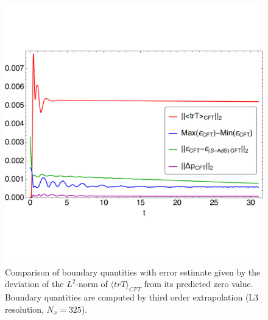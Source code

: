 \documentclass[a4paper,11pt]{article}
\begin{document}




\begin{figure}[!h]
        \centering
        \includegraphics[width=5.0in,clip=true]{plots/bdyplots/L3/L2-norm_trace_anisotropy_energydensityminusschw_maxminusminenergydensity/fullplotfillregttraceanisotropyenergydensityminusschwmaxminusminbdyenergydensity_L3.pdf}
\parbox{5.0in}{\caption{Comparison of boundary quantities with error estimate given by the deviation of the $L^2$-norm of $\langle trT\rangle_{CFT}$ from its predicted zero value. Boundary quantities are computed by third order extrapolation (L3 resolution, $N_x=325$).
        }\label{fig:fullplotfillregttraceanisotropyenergydensityminusschwmaxminusminbdyenergydensity.pdf}}
\end{figure}
\end{document}
